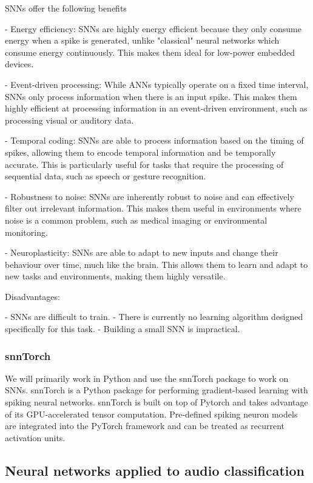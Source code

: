 \documentclass{article}
\begin{document}
{\color{blue}
  SNNs offer the following benefits

  - Energy efficiency: SNNs are highly energy efficient because they only consume energy when a spike is generated, unlike "classical" neural networks which consume energy continuously. This makes them ideal for low-power embedded devices.

  - Event-driven processing: While ANNs typically operate on a fixed time interval, SNNs only process information when there is an input spike. This makes them highly efficient at processing information in an event-driven environment, such as processing visual or auditory data.

  - Temporal coding: SNNs are able to process information based on the timing of spikes, allowing them to encode temporal information and be temporally accurate. This is particularly useful for tasks that require the processing of sequential data, such as speech or gesture recognition.

  - Robustness to noise: SNNs are inherently robust to noise and can effectively filter out irrelevant information. This makes them useful in environments where noise is a common problem, such as medical imaging or environmental monitoring.

  - Neuroplasticity: SNNs are able to adapt to new inputs and change their behaviour over time, much like the brain. This allows them to learn and adapt to new tasks and environments, making them highly versatile.


  Disadvantages:

  - SNNs are difficult to train.
  - There is currently no learning algorithm designed specifically for this task.
  - Building a small SNN is impractical.
}



\subsubsection{snnTorch}
We will primarily work in Python and use the snnTorch package to work on SNNs. snnTorch is a Python package for performing gradient-based learning with spiking neural networks. snnTorch is built on top of Pytorch and takes advantage of its GPU-accelerated tensor computation. Pre-defined spiking neuron models are integrated into the PyTorch framework and can be treated as recurrent activation units.

\subsection{Neural networks applied to audio classification}
\end{document}
